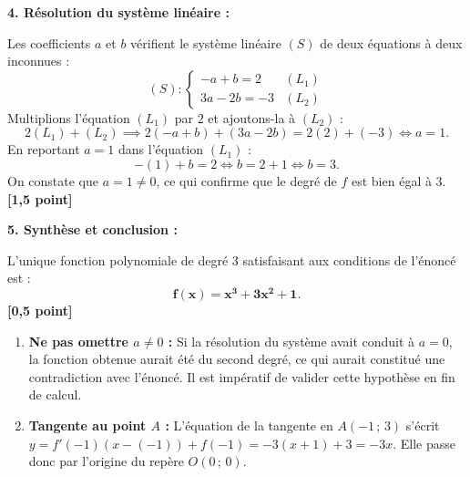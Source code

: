 \documentclass[11pt,a4paper]{article}
\begin{document}
\begin{correctionbox}
\medskip
\textbf{4. Résolution du système linéaire :}

Les coefficients $a$ et $b$ vérifient le système linéaire $(S)$ de deux équations à deux inconnues :
\[
(S) : \begin{cases}
-a + b = 2 & (L_1) \\
3a - 2b = -3 & (L_2)
\end{cases}
\]
Multiplions l'équation $(L_1)$ par $2$ et ajoutons-la à $(L_2)$ :
\[
2(L_1) + (L_2) \implies 2(-a + b) + (3a - 2b) = 2(2) + (-3) \iff a = 1.
\]
En reportant $a = 1$ dans l'équation $(L_1)$ :
\[
-(1) + b = 2 \iff b = 2 + 1 \iff b = 3.
\]
On constate que $a = 1 \neq 0$, ce qui confirme que le degré de $f$ est bien égal à 3. \hfill \textbf{[1{,}5 point]}

\medskip
\textbf{5. Synthèse et conclusion :}

L'unique fonction polynomiale de degré 3 satisfaisant aux conditions de l'énoncé est :
\[
\mathbf{f(x) = x^3 + 3x^2 + 1}.
\] \hfill \textbf{[0{,}5 point]}
\end{correctionbox}

\begin{alertebox}
\begin{enumerate}
    \item \textbf{Ne pas omettre $a \neq 0$ :} Si la résolution du système avait conduit à $a = 0$, la fonction obtenue aurait été du second degré, ce qui aurait constitué une contradiction avec l'énoncé. Il est impératif de valider cette hypothèse en fin de calcul.
    \item \textbf{Tangente au point $A$ :} L'équation de la tangente en $A(-1\,;\,3)$ s'écrit $y = f'(-1)(x - (-1)) + f(-1) = -3(x + 1) + 3 = -3x$. Elle passe donc par l'origine du repère $O(0\,;\,0)$.
\end{enumerate}
\end{alertebox}
\end{document}
